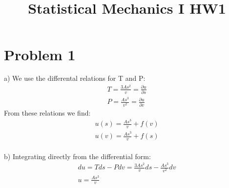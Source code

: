 \documentclass[a4paper,10pt]{article}
\title{Statistical Mechanics I HW1}
\numberwithin{equation}{section}
\begin{document}
\maketitle

\section{Problem 1}
a) We use the differental relations for T and P:
\begin{gather}
 T=\frac{3As^2}{v}=\frac{\partial u}{\partial s}\\
 P=\frac{As^3}{v^2}=\frac{\partial u}{\partial v}
\end{gather}
From these relations we find:
\begin{gather}
 u(s) = \frac{As^3}{v}+f(v)\\
 u(v) = \frac{As^3}{v}+f(s)
\end{gather}
\\
b) Integrating directly from the differential form:
\begin{gather}
 du = Tds - Pdv = \frac{3As^2}{v}ds - \frac{As^3}{v^2}dv\\
 u = \frac{As^3}{v}
\end{gather}
\end{document}
